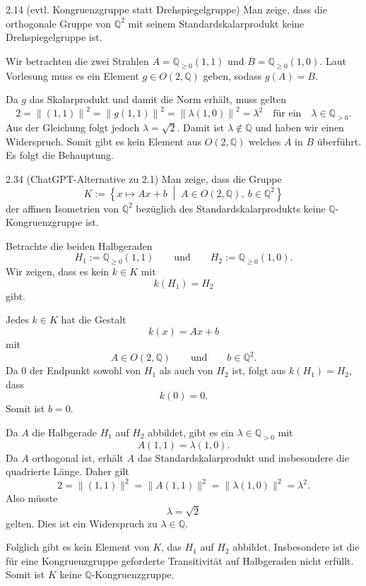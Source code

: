 \begin{exercise}{2.1}{4 (evtl. Kongruenzgruppe statt Drehspiegelgruppe)}
    Man zeige, dass die orthogonale Gruppe von $\mathbb Q^2$ mit seinem Standardskalarprodukt keine Drehspiegelgruppe ist.
\end{exercise}
Wir betrachten die zwei Strahlen $A = \mathbb Q_{\geq 0}(1,1)$ und $B = \mathbb Q_{\geq 0}(1,0)$.
Laut Vorlesung muss es ein Element $g\in O(2, \mathbb Q)$ geben, sodass $g(A) = B$.

Da $g$ das Skalarprodukt und damit die Norm erhält, muss gelten 
\[
2 = \left\|(1,1)\right\|^2 = \left\|g(1,1)\right\|^2 = \left\|\lambda(1,0)\right\|^2 = \lambda ^2 \quad \text{für ein} \quad \lambda \in \mathbb Q_{>0}.
\]
Aus der Gleichung folgt jedoch $\lambda=\sqrt{2}$. Damit ist $\lambda \notin \mathbb Q$ und haben wir einen Widerspruch. Somit gibt es kein Element aus $O(2, \mathbb Q)$ welches $A$ in $B$ überführt. Es folgt die Behauptung.

\begin{exercise}{2.3}{4 (ChatGPT-Alternative zu 2.1)}
    Man zeige, dass die Gruppe
    \[
        K
        :=
        \left\{
            x\mapsto Ax+b
            \;\middle|\;
            A\in O(2,\mathbb Q),\ b\in\mathbb Q^2
        \right\}
    \]
    der affinen Isometrien von \(\mathbb Q^2\) bezüglich des
    Standardskalarprodukts keine \(\mathbb Q\)-Kongruenzgruppe ist.
\end{exercise}

Betrachte die beiden Halbgeraden
\[
    H_1:=\mathbb Q_{\geq 0}(1,1)
    \qquad\text{und}\qquad
    H_2:=\mathbb Q_{\geq 0}(1,0).
\]
Wir zeigen, dass es kein \(k\in K\) mit
\[
    k(H_1)=H_2
\]
gibt.

Jedes \(k\in K\) hat die Gestalt
\[
    k(x)=Ax+b
\]
mit
\[
    A\in O(2,\mathbb Q)
    \qquad\text{und}\qquad
    b\in\mathbb Q^2.
\]
Da \(0\) der Endpunkt sowohl von \(H_1\) als auch von \(H_2\) ist,
folgt aus \(k(H_1)=H_2\), dass
\[
    k(0)=0.
\]
Somit ist \(b=0\).

Da \(A\) die Halbgerade \(H_1\) auf \(H_2\) abbildet, gibt es ein
\(\lambda\in\mathbb Q_{>0}\) mit
\[
    A(1,1)=\lambda(1,0).
\]
Da \(A\) orthogonal ist, erhält \(A\) das Standardskalarprodukt und
insbesondere die quadrierte Länge. Daher gilt
\[
    2
    =
    \|(1,1)\|^2
    =
    \|A(1,1)\|^2
    =
    \|\lambda(1,0)\|^2
    =
    \lambda^2.
\]
Also müsste
\[
    \lambda=\sqrt2
\]
gelten. Dies ist ein Widerspruch zu \(\lambda\in\mathbb Q\).

Folglich gibt es kein Element von \(K\), das \(H_1\) auf \(H_2\)
abbildet. Insbesondere ist die für eine Kongruenzgruppe geforderte
Transitivität auf Halbgeraden nicht erfüllt. Somit ist \(K\)
keine \(\mathbb Q\)-Kongruenzgruppe.

